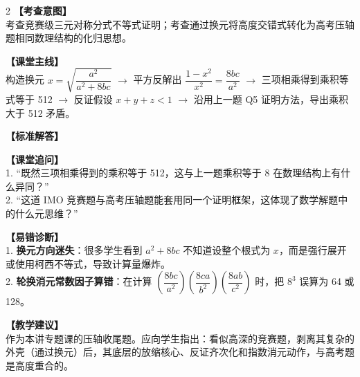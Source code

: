 \documentclass[11pt,a4paper]{ctexart}
\begin{document}
\begin{paracol}{2}
  \textbf{【考查意图】}\\
  考查竞赛级三元对称分式不等式证明；考查通过换元将高度交错式转化为高考压轴题相同数理结构的化归思想。
  
  \textbf{【课堂主线】}\\
  构造换元 \(x = \sqrt{\dfrac{a^2}{a^2+8bc}}\) \(\to\) 平方反解出 \(\dfrac{1-x^2}{x^2} = \dfrac{8bc}{a^2}\) \(\to\) 三项相乘得到乘积等式等于 512 \(\to\) 反证假设 \(x+y+z < 1\) \(\to\) 沿用上一题 Q5 证明方法，导出乘积大于 512 矛盾。
  
  \textbf{【标准解答】}\\
  \qSixSolution
  
  \textbf{【课堂追问】}\\
  1. “既然三项相乘得到的乘积等于 512，这与上一题乘积等于 8 在数理结构上有什么异同？”\\
  2. “这道 IMO 竞赛题与高考压轴题能套用同一个证明框架，这体现了数学解题中的什么元思维？”
  
  \switchcolumn
  \textbf{【易错诊断】}\\
  1. \textbf{换元方向迷失}：很多学生看到 \(a^2 + 8bc\) 不知道设整个根式为 \(x\)，而是强行展开或使用柯西不等式，导致计算量爆炸。\\
  2. \textbf{轮换消元常数因子算错}：在计算 \(\left(\dfrac{8bc}{a^2}\right)\left(\dfrac{8ca}{b^2}\right)\left(\dfrac{8ab}{c^2}\right)\) 时，把 \(8^3\) 误算为 64 或 128。
  
  \textbf{【教学建议】}\\
  作为本讲专题课的压轴收尾题。应向学生指出：看似高深的竞赛题，剥离其复杂的外壳（通过换元）后，其底层的放缩核心、反证齐次化和指数消元动作，与高考题是高度重合的。
\end{paracol}

\vspace{0.8em}
\par{}
\vspace{0.8em}

\qSevenStem
\end{document}
